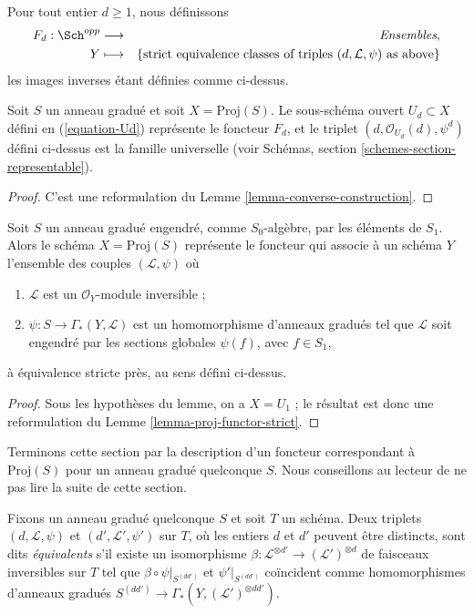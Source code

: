 \medskip\noindent
Pour tout entier $d \geq 1$, nous définissons
\begin{eqnarray*}
F_d : \Sch^{opp} & \longrightarrow & \textit{Ensembles}, \\
Y & \longmapsto &
\{\text{strict equivalence classes of triples }
(d, \mathcal{L}, \psi)
\text{ as above}\}
\end{eqnarray*}
les images inverses étant définies comme ci-dessus.

\begin{lemma}
\label{lemma-proj-functor-strict}
Soit $S$ un anneau gradué et soit
$X = \text{Proj}(S)$. Le sous-schéma ouvert
$U_d \subset X$ défini en (\ref{equation-Ud}) représente le foncteur $F_d$,
et le triplet $(d, \mathcal{O}_{U_d}(d), \psi^d)$ défini ci-dessus est la
famille universelle (voir Schémas,
section \ref{schemes-section-representable}).
\end{lemma}

\begin{proof}
C'est une reformulation du Lemme \ref{lemma-converse-construction}.
\end{proof}

\begin{lemma}
\label{lemma-apply}
Soit $S$ un anneau gradué engendré, comme $S_0$-algèbre, par les éléments de
$S_1$. Alors le schéma $X = \text{Proj}(S)$
représente le foncteur qui associe
à un schéma $Y$ l'ensemble des couples $(\mathcal{L}, \psi)$ où
\begin{enumerate}
\item $\mathcal{L}$ est un $\mathcal{O}_Y$-module inversible ;
\item $\psi : S \to \Gamma_*(Y, \mathcal{L})$ est un homomorphisme d'anneaux
gradués tel que $\mathcal{L}$ soit engendré par les sections globales
$\psi(f)$, avec $f \in S_1$,
\end{enumerate}
à équivalence stricte près, au sens défini ci-dessus.
\end{lemma}

\begin{proof}
Sous les hypothèses du lemme, on a $X = U_1$ ; le résultat est donc une
reformulation du Lemme \ref{lemma-proj-functor-strict}.
\end{proof}

\noindent
Terminons cette section par la description d'un foncteur correspondant à
$\text{Proj}(S)$ pour un anneau gradué quelconque $S$. Nous conseillons au
lecteur de ne pas lire la suite de cette section.

\medskip\noindent
Fixons un anneau gradué quelconque $S$ et soit $T$ un schéma. Deux triplets
$(d, \mathcal{L}, \psi)$ et $(d', \mathcal{L}', \psi')$ sur $T$, où les
entiers $d$ et $d'$ peuvent être distincts, sont
dits {\it équivalents} s'il existe un isomorphisme
$\beta : \mathcal{L}^{\otimes d'} \to (\mathcal{L}')^{\otimes d}$
de faisceaux inversibles sur $T$ tel que
$\beta \circ \psi|_{S^{(dd')}}$ et $\psi'|_{S^{(dd')}}$ coïncident comme
homomorphismes d'anneaux gradués
$S^{(dd')} \to \Gamma_*(Y, (\mathcal{L}')^{\otimes dd'})$.

